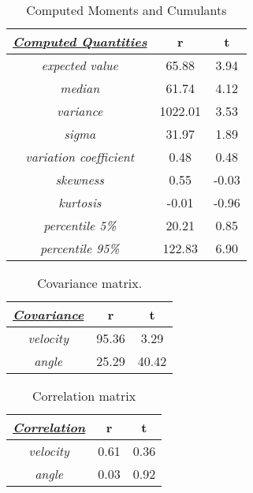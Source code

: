 \begin{table}[h!]
\centering
\caption{Computed Moments and Cumulants}
\label{ScalarMoments}
\begin{tabular}{|c|c|c|}
\hline
{\ul \textit{\textbf{Computed Quantities}}} & \textbf{r} & \textbf{t} \\ \hline
\textit{expected value}                     & 65.88   & 3.94   \\ \hline
\textit{median}                             & 61.74   & 4.12   \\ \hline
\textit{variance}                           & 1022.01 & 3.53   \\ \hline
\textit{sigma}                              & 31.97   & 1.89  \\ \hline
\textit{variation coefficient}              & 0.48    & 0.48   \\ \hline
\textit{skewness}                           & 0.55    & -0.03  \\ \hline
\textit{kurtosis}                           & -0.01   & -0.96  \\ \hline
\textit{percentile 5\%}                     & 20.21   & 0.85   \\ \hline
\textit{percentile 95\%}                    & 122.83  & 6.90   \\ \hline
\end{tabular}
\end{table}
\begin{table}[h!]
\centering
\caption{Covariance matrix.}
\label{covarianceComputed}
\begin{tabular}{|c|c|c|}
\hline
{\ul \textit{\textbf{Covariance}}} & \textbf{r} & \textbf{t} \\ \hline
\textit{velocity}                     & 95.36   & 3.29   \\ \hline
\textit{angle}                        & 25.29   & 40.42   \\ \hline
\end{tabular}
\end{table}
\begin{table}[h!]
\centering
\caption{Correlation matrix}
\label{pearsonComputed}
\begin{tabular}{|c|c|c|}
\hline
{\ul \textit{\textbf{Correlation}}} & \textbf{r} & \textbf{t} \\ \hline
\textit{velocity}                     & 0.61   & 0.36   \\ \hline
\textit{angle}                        & 0.03   & 0.92   \\ \hline
\end{tabular}
\end{table}
